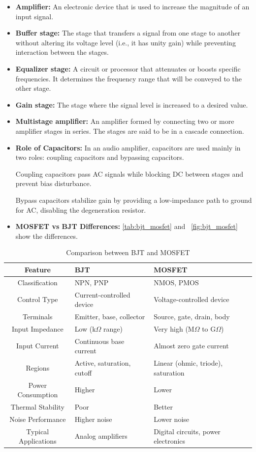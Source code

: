 \documentclass[12pt, a4paper]{article}
\numberwithin{table}{section}
\numberwithin{figure}{section}
\begin{document}
\begin{itemize}
    \item \textbf{Amplifier:} An electronic device that is used to increase the magnitude of an input signal.
    \item \textbf{Buffer stage:} The stage that transfers a signal from one stage to another without altering its voltage level (i.e., it has unity gain) while preventing interaction between the stages.
    \item \textbf{Equalizer stage:} A circuit or processor that attenuates or boosts specific frequencies. It determines the frequency range that will be conveyed to the other stage.
    \item \textbf{Gain stage:} The stage where the signal level is increased to a desired value.
    \item \textbf{Multistage amplifier:} An amplifier formed by connecting two or more amplifier stages in series. The stages are said to be in a cascade connection.
    \item \textbf{Role of Capacitors:} In an audio amplifier, capacitors are used mainly in two roles: coupling capacitors and bypassing capacitors.

    Coupling capacitors pass AC signals while blocking DC between stages and prevent bias disturbance.
    
    Bypass capacitors stabilize gain by providing a low-impedance path to ground for AC, disabling the degeneration resistor.
    \item \textbf{MOSFET vs BJT Differences:} \autoref{tab:bjt_mosfet} and ~\autoref{fig:bjt_mosfet} show the differences.
\end{itemize}

\begin{table}[h]
\caption{Comparison between BJT and MOSFET}
\centering
\renewcommand{\arraystretch}{1.3}
\begin{tabular}{|c|p{4.5cm}|p{5.7cm}|}
\hline
\textbf{Feature} & \textbf{BJT} & \textbf{MOSFET} \\
\hline
Classification & NPN, PNP & NMOS, PMOS \\
\hline
Control Type & Current-controlled device & Voltage-controlled device \\
\hline
Terminals & Emitter, base, collector & Source, gate, drain, body \\
\hline
Input Impedance & Low (k$\Omega$ range) & Very high (M$\Omega$ to G$\Omega$) \\
\hline
Input Current & Continuous base current & Almost zero gate current \\
\hline
Regions & Active, saturation, cutoff & Linear (ohmic, triode), saturation \\
\hline
Power Consumption & Higher & Lower \\
\hline
Thermal Stability & Poor & Better \\
\hline
Noise Performance & Higher noise & Lower noise \\
\hline
Typical Applications & Analog amplifiers & Digital circuits, power electronics \\
\hline
\end{tabular}
\label{tab:bjt_mosfet}
\end{table}
\end{document}
